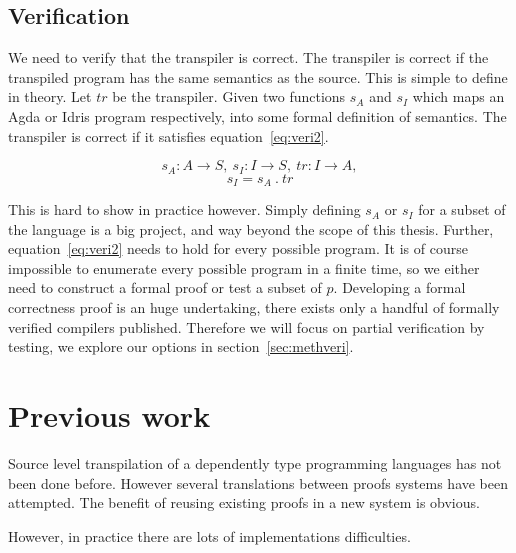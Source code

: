 \subsection{Verification}\label{sec:veri}

We need to verify that the transpiler is correct. The transpiler is correct if
the transpiled program has the same semantics as the source.
This is simple to define in theory.
Let $tr$ be the transpiler.
Given two functions $s_A$ and $s_I$ which maps an Agda or Idris program
respectively, into some formal definition of semantics.
The transpiler is correct if it satisfies equation~\ref{eq:veri2}.

\begin{equation} \label{eq:veri1}
  s_A : A \rightarrow S,
  \ s_I : I \rightarrow S,
  \ tr : I \rightarrow A,
\end{equation}
\begin{equation} \label{eq:veri2}
  s_I = s_A\ .\ tr
\end{equation}

This is hard to show in practice however. Simply defining $s_A$ or $s_I$ for
a subset of the language is a big project, and way beyond the scope of this
thesis.
Further, equation~\ref{eq:veri2} needs to hold for every possible program.
It is of course impossible to enumerate every possible program in a finite
time, so we either need to construct a formal proof or test a subset of $p$.
Developing a formal correctness proof is an huge undertaking, there
exists only a handful of formally verified compilers published. Therefore we
will focus on partial verification by testing, we explore our options in
section~\ref{sec:methveri}.



\section{Previous work}

Source level transpilation of a dependently type programming languages has not
been done before. However several translations between proofs systems have been
attempted. The benefit of reusing existing proofs in a new system is obvious.

However, in practice there are lots of implementations difficulties.

